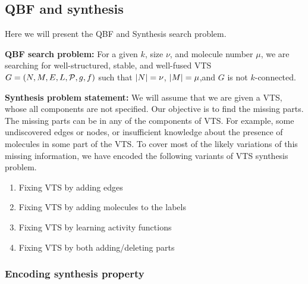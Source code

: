 \subsection{QBF and synthesis}
Here we will present the QBF and Synthesis search problem.

  \textbf{QBF search problem:}
For a given $k$, size $\nu$, and molecule number $\mu$,
we are searching for well-structured, stable, and well-fused VTS
$G = (N,M,E,L,\mathcal{P},g,f)$ such that
$|N| = \nu$, $|M| = \mu$,and
$G$ is not $k$-connected.    

%

\textbf{Synthesis problem statement:}
We will assume that we are given a VTS, whose all components
are not specified.
%
Our objective is to find the missing parts.
%
The missing parts can be in any of the components of VTS. 
%
For example, some undiscovered edges or nodes, or insufficient
knowledge about the presence of molecules in some part of the VTS.
%
To cover most of the likely variations of this missing information,
we have encoded the following variants of VTS synthesis problem.

\begin{enumerate}
	\item Fixing VTS by adding edges 
	\item Fixing VTS by adding molecules to the labels
	\item Fixing VTS by learning activity functions
	\item  Fixing VTS by both adding/deleting parts
\end{enumerate}

\subsubsection{Encoding synthesis property}

